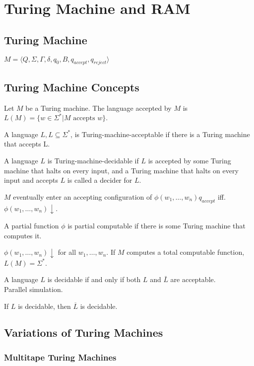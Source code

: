 \section{Turing Machine and RAM}

\subsection{Turing Machine}

 $M=\langle
Q,\Sigma,\Gamma,\delta,q_0,B,q_{accept},q_{reject}\rangle$

\subsection{Turing Machine Concepts}

 Let $M$ be a Turing machine. The language accepted by $M$ is
$L(M) = \{w \in \Sigma^* | M \text{ accepts } w\}$.

 A language $L, L \subseteq \Sigma^*$, is
Turing-machine-acceptable if there is a Turing machine
that accepts L.

 A language $L$ is Turing-machine-decidable if $L$ is accepted
by some Turing machine that halts on every input, and a Turing machine that halts on
every input and accepts $L$ is called a decider for $L$.

 $M$ eventually enter an accepting configuration of
$\phi(w_1,\ldots,w_n)q_{accept}$ iff.
$\phi(w_1,\ldots,w_n)\downarrow$.

 A partial function $\phi$ is partial computable if there
is some Turing machine
that computes it.

 $\phi(w_1,\ldots,w_n)\downarrow$ for all
$w_1,\ldots,w_n$. If $M$ computes a total computable function, $L(M)=\Sigma^*$.

 A language $L$ is decidable if and only if both $L$ and
$\bar{L}$ are acceptable.\\
Parallel simulation.


 If $L$ is decidable, then $\overline{L}$ is decidable.

\subsection{Variations of Turing Machines}

\subsubsection{Multitape Turing Machines}


